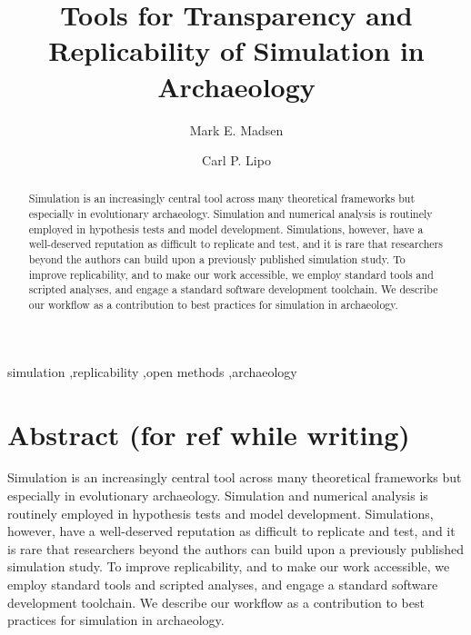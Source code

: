 \documentclass[preprint,times,authoryear,10pt]{elsarticle}
\begin{document}
\begin{frontmatter}


\title{Tools for Transparency and Replicability of Simulation in Archaeology}

\author{Mark E. Madsen}
\address{Department of Anthropology, Box 353100, University of Washington, Seattle WA, 98195 USA}

\author{Carl P. Lipo}
\address{Department of Anthropology and IIRMES, 1250 Bellflower Blvd, California State University at Long Beach, Long Beach CA, 90840 USA}


\begin{abstract}
Simulation is an increasingly central tool across many theoretical frameworks but especially in evolutionary archaeology. Simulation and numerical analysis is routinely employed in hypothesis tests and model development. Simulations, however, have a well-deserved reputation as difficult to replicate and test, and it is rare that researchers beyond the authors can build upon a previously published simulation study. To improve replicability, and to make our work accessible, we employ standard tools and scripted analyses, and engage a standard software development toolchain. We describe our workflow as a contribution to best practices for simulation in archaeology.

\end{abstract}

\begin{keyword}
simulation \sep replicability \sep open methods \sep archaeology
\end{keyword}


\end{frontmatter}

\section{Abstract (for ref while
writing)}\label{abstract-for-ref-while-writing}

Simulation is an increasingly central tool across many theoretical
frameworks but especially in evolutionary archaeology. Simulation and
numerical analysis is routinely employed in hypothesis tests and model
development. Simulations, however, have a well-deserved reputation as
difficult to replicate and test, and it is rare that researchers beyond
the authors can build upon a previously published simulation study. To
improve replicability, and to make our work accessible, we employ
standard tools and scripted analyses, and engage a standard software
development toolchain. We describe our workflow as a contribution to
best practices for simulation in archaeology.
\end{document}
